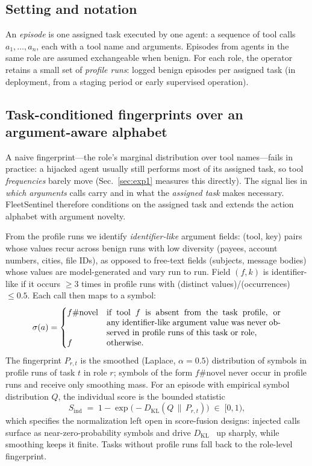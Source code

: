 \documentclass[conference]{IEEEtran}
\newcommand{\sys}{FleetSentinel}
\begin{document}
\subsection{Setting and notation}
An \emph{episode} is one assigned task executed by one agent: a sequence of tool calls $a_1,\dots,a_n$, each with a tool name and arguments. Episodes from agents in the same role are assumed exchangeable when benign. For each role, the operator retains a small set of \emph{profile runs}: logged benign episodes per assigned task (in deployment, from a staging period or early supervised operation).

\subsection{Task-conditioned fingerprints over an argument-aware alphabet}\label{sec:fingerprint}
A naive fingerprint---the role's marginal distribution over tool names---fails in practice: a hijacked agent usually still performs most of its assigned task, so tool \emph{frequencies} barely move (Sec.~\ref{sec:exp1} measures this directly). The signal lies in \emph{which arguments} calls carry and in what the \emph{assigned task} makes necessary. \sys{} therefore conditions on the assigned task and extends the action alphabet with argument novelty.

From the profile runs we identify \emph{identifier-like} argument fields: (tool, key) pairs whose values recur across benign runs with low diversity (payees, account numbers, cities, file IDs), as opposed to free-text fields (subjects, message bodies) whose values are model-generated and vary run to run. Field $(f,k)$ is identifier-like if it occurs $\ge 3$ times in profile runs with (distinct values)/(occurrences) $\le 0.5$. Each call then maps to a symbol:
\[
\sigma(a) =
\begin{cases}
f\#\mathrm{novel} & \parbox[t]{0.6\linewidth}{if tool $f$ is absent from the task profile, or any identifier-like argument value was never observed in profile runs of this task or role,}\\[1ex]
f & \text{otherwise.}
\end{cases}
\]
The fingerprint $P_{r,t}$ is the smoothed (Laplace, $\alpha{=}0.5$) distribution of symbols in profile runs of task $t$ in role $r$; symbols of the form $f\#\mathrm{novel}$ never occur in profile runs and receive only smoothing mass. For an episode with empirical symbol distribution $Q$, the individual score is the bounded statistic
\begin{equation}
S_{\mathrm{ind}} \;=\; 1 - \exp\!\big(-D_{\mathrm{KL}}(Q \,\|\, P_{r,t})\big) \;\in\; [0,1),
\label{eq:sind}
\end{equation}
which specifies the normalization left open in score-fusion designs: injected calls surface as near-zero-probability symbols and drive $D_{\mathrm{KL}}$~\cite{kullback1951} up sharply, while smoothing keeps it finite. Tasks without profile runs fall back to the role-level fingerprint.
\end{document}
